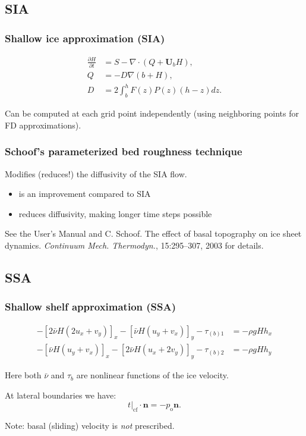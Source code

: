\documentclass[hide notes,intlimits]{beamer}
\begin{document}
\subsection{SIA}
\label{sec:sia}

\begin{frame}
  \frametitle{Shallow ice approximation (SIA)}

  \begin{align}
    \label{eq:2}
    \frac{\partial H}{\partial t} &= S - \nabla \cdot (Q + \mathbf{U}_b H),\\
    Q &= -D \nabla (b + H),\\
    D &= 2\int_b^h F(z)P(z)(h-z)dz.
  \end{align}

  Can be computed at each grid point independently (using neighboring
  points for FD approximations).

\end{frame}

\begin{frame}
  \frametitle{Schoof's parameterized bed roughness technique}

  Modifies (reduces!) the diffusivity of the SIA flow.

  \begin{itemize}
  \item is an improvement compared to SIA
  \item reduces diffusivity, making longer time steps possible
  \end{itemize}

  See the User's Manual and C. Schoof. The effect of basal topography
  on ice sheet dynamics. \emph{Continuum Mech. Thermodyn.},
  15:295–307, 2003 for details.
\end{frame}

\subsection{SSA}
\label{sec:ssa}

\begin{frame}
  \frametitle{Shallow shelf approximation (SSA)}

  \begin{align}
    -\left[ 2\bar\nu H\left( 2u_{x} + v_{y}\right)\right]_{x} - \left[\bar\nu
    H\left(u_{y}+v_{x} \right) \right]_{y} - \tau_{(b)1} &= - \rho gH h_{x} \\
    -\left[ \bar\nu H\left( u_{y} + v_{x} \right)\right]_{x} - \left[2\bar\nu
    H\left(u_{x}+2v_{y}  \right) \right]_{y} - \tau_{(b)2} &= -\rho gH h_{y}
  \end{align}

  Here both $\bar \nu$ and $\tau_{b}$ are nonlinear functions of the ice velocity.

  \medskip
  At lateral boundaries we have:
  \begin{equation*}
    \label{eq:5}
    \left.t\right|_{\text{cf}} \cdot \mathbf{n} = -p_{\text{o}} \mathbf{n}.
  \end{equation*}

  Note: basal (sliding) velocity is \emph{not} prescribed.

\end{frame}
\end{document}
